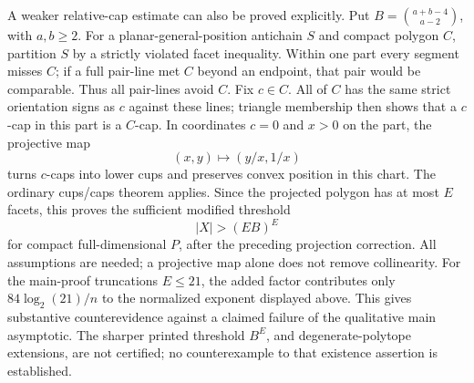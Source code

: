 \documentclass[10pt]{article}
\begin{document}
A weaker relative-cap estimate can also be proved explicitly. Put \(B=\binom{a+b-4}{a-2}\), with \(a,b\ge2\). For a planar-general-position antichain \(S\) and compact polygon \(C\), partition \(S\) by a strictly violated facet inequality. Within one part every segment misses \(C\); if a full pair-line met \(C\) beyond an endpoint, that pair would be comparable. Thus all pair-lines avoid \(C\). Fix \(c\in C\). All of \(C\) has the same strict orientation signs as \(c\) against these lines; triangle membership then shows that a \(c\)-cap in this part is a \(C\)-cap. In coordinates \(c=0\) and \(x>0\) on the part, the projective map \[(x,y)\longmapsto (y/x,1/x)\] turns \(c\)-caps into lower cups and preserves convex position in this chart. The ordinary cups/caps theorem applies. Since the projected polygon has at most \(E\) facets, this proves the sufficient modified threshold \[|X|>(E B)^E\] for compact full-dimensional \(P\), after the preceding projection correction. All assumptions are needed; a projective map alone does not remove collinearity. For the main-proof truncations \(E\le21\), the added factor contributes only \(84\log_2(21)/n\) to the normalized exponent displayed above. This gives substantive counterevidence against a claimed failure of the qualitative main asymptotic. The sharper printed threshold \(B^E\), and degenerate-polytope extensions, are not certified; no counterexample to that existence assertion is established.\par
\end{document}
